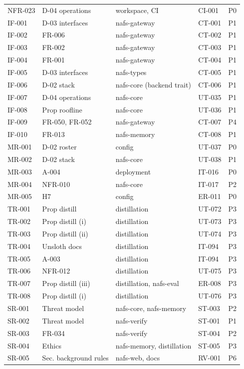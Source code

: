 \begin{longtable}{@{}p{1.45cm}p{4.4cm}p{4.2cm}p{3.1cm}p{1.1cm}@{}}
NFR-023 & D-04 operations & workspace, CI & CI-001 & P0\\
IF-001 & D-03 interfaces & nafs-gateway & CT-001 & P1\\
IF-002 & FR-006 & nafs-gateway & CT-002 & P1\\
IF-003 & FR-002 & nafs-gateway & CT-003 & P1\\
IF-004 & FR-001 & nafs-gateway & CT-004 & P1\\
IF-005 & D-03 interfaces & nafs-types & CT-005 & P1\\
IF-006 & D-02 stack & nafs-core (backend trait) & CT-006 & P1\\
IF-007 & D-04 operations & nafs-core & UT-035 & P1\\
IF-008 & Prop roofline & nafs-core & UT-036 & P1\\
IF-009 & FR-050, FR-052 & nafs-gateway & CT-007 & P4\\
IF-010 & FR-013 & nafs-memory & CT-008 & P1\\
MR-001 & D-02 roster & config & UT-037 & P0\\
MR-002 & D-02 stack & nafs-core & UT-038 & P1\\
MR-003 & A-004 & deployment & IT-016 & P0\\
MR-004 & NFR-010 & nafs-core & IT-017 & P2\\
MR-005 & H7 & config & ER-011 & P0\\
TR-001 & Prop distill & distillation & UT-072 & P3\\
TR-002 & Prop distill (i) & distillation & UT-073 & P3\\
TR-003 & Prop distill (ii) & distillation & UT-074 & P3\\
TR-004 & Unsloth docs & distillation & IT-094 & P3\\
TR-005 & A-003 & distillation & IT-094 & P3\\
TR-006 & NFR-012 & distillation & UT-075 & P3\\
TR-007 & Prop distill (iii) & distillation, nafs-eval & ER-008 & P3\\
TR-008 & Prop distill (i) & distillation & UT-076 & P3\\
SR-001 & Threat model & nafs-core, nafs-memory & ST-003 & P2\\
SR-002 & Threat model & nafs-verify & ST-001 & P1\\
SR-003 & FR-034 & nafs-verify & ST-004 & P2\\
SR-004 & Ethics & nafs-memory, distillation & ST-005 & P3\\
SR-005 & Sec. background rules & nafs-web, docs & RV-001 & P6\\

\end{longtable}
